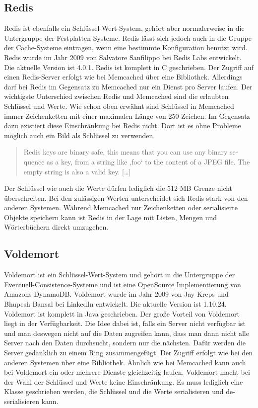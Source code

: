 \subsection{Redis}
Redis ist ebenfalls ein Schlüssel-Wert-System, gehört aber normalerweise in die
Untergruppe der Festplatten-Systeme. Redis lässt sich jedoch auch in die Gruppe
der Cache-Systeme eintragen, wenn eine bestimmte Konfiguration benutzt wird.
Redis wurde im Jahr 2009 von Salvatore Sanfilippo bei Redis Labs entwickelt.
Die aktuelle Version ist 4.0.1. Redis ist komplett in C geschrieben.
Der Zugriff auf einen Redis-Server erfolgt wie bei Memcached über eine Bibliothek.
Allerdings darf bei Redis im Gegensatz zu Memcached nur ein Dienst pro Server
laufen. Der wichtigste Unterschied zwischen Redis und Memcached sind die
erlaubten Schlüssel und Werte. Wie schon oben erwähnt sind Schlüssel in Memcached
immer Zeichenketten mit einer maximalen Länge von 250 Zeichen. Im Gegensatz dazu
existiert diese Einschränkung bei Redis nicht. Dort ist es ohne Probleme möglich
auch ein Bild als Schlüssel zu verwenden.

\foreignblockquote{english}[\cite{Redis2010}]{Redis keys are binary safe, this
means that you can use any binary sequence as a key, from a string like ‚foo‘
to the content of a JPEG file. The empty string is also a valid key. [\dots]}

Der Schlüssel wie auch die Werte dürfen lediglich die 512 MB Grenze nicht
überschreiten. Bei den zulässigen Werten unterscheidet sich Redis stark von den
anderen Systemen. Während Memcached nur Zeichenketten oder serialisierte Objekte
speichern kann ist Redis in der Lage mit Listen, Mengen und Wörterbüchern direkt
umzugehen.

\subsection{Voldemort}
Voldemort ist ein Schlüssel-Wert-System und gehört in die Untergruppe der
Eventuell-Consistence-Systeme und ist eine OpenSource Implementierung von
Amazons DynamoDB. Voldemort wurde im Jahr 2009 von Jay Kreps und Bhupesh Bansal
bei LinkedIn entwickelt. Die aktuelle Version ist 1.10.24. Voldemort ist komplett
in Java geschrieben. Der große Vorteil von Voldemort liegt in der Verfügbarkeit.
Die Idee dabei ist, falls ein Server nicht verfügbar ist und man deswegen nicht
auf die Daten zugreifen kann, dass man dann nicht alle Server nach den Daten
durchsucht, sondern nur die nächsten. Dafür werden die Server gedanklich zu
einem Ring zusammengefügt. Der Zugriff erfolgt wie bei den anderen Systemen
über eine Bibliothek. Ähnlich wie bei Memcached kann auch bei Voldemort ein
oder mehrere Dienste gleichzeitig laufen. Voldemort macht bei der Wahl der
Schlüssel und Werte keine Einschränkung. Es muss lediglich eine Klasse
geschrieben werden, die Schlüssel und die Werte serialisieren und
de-serialisieren kann.

